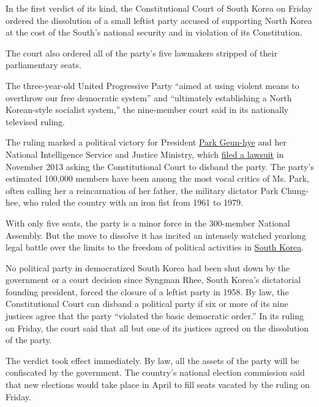 In the first verdict of its kind, the Constitutional Court of South
Korea on Friday ordered the dissolution of a small leftist party accused
of supporting North Korea at the cost of the South's national security
and in violation of its Constitution.

The court also ordered all of the party's five lawmakers stripped of
their parliamentary seats.

The three-year-old United Progressive Party ``aimed at using violent
means to overthrow our free democratic system'' and ``ultimately
establishing a North Korean-style socialist system,'' the nine-member
court said in its nationally televised ruling.

The ruling marked a political victory for President
\href{http://topics.nytimes3xbfgragh.onion/top/reference/timestopics/people/p/park_geunhye/index.html}{Park
Geun-hye} and her National Intelligence Service and Justice Ministry,
which
\href{http://www.nytimes3xbfgragh.onion/2013/11/06/world/asia/south-korean-government-seeks-ban-of-small-leftist-party.html}{filed
a lawsuit} in November 2013 asking the Constitutional Court to disband
the party. The party's estimated 100,000 members have been among the
most vocal critics of Ms. Park, often calling her a reincarnation of her
father, the military dictator Park Chung-hee, who ruled the country with
an iron fist from 1961 to 1979.

With only five seats, the party is a minor force in the 300-member
National Assembly. But the move to dissolve it has incited an intensely
watched yearlong legal battle over the limits to the freedom of
political activities in
\href{http://topics.nytimes3xbfgragh.onion/top/news/international/countriesandterritories/southkorea/index.html}{South
Korea}.

No political party in democratized South Korea had been shut down by the
government or a court decision since Syngman Rhee, South Korea's
dictatorial founding president, forced the closure of a leftist party in
1958. By law, the Constitutional Court can disband a political party if
six or more of its nine justices agree that the party ``violated the
basic democratic order.'' In its ruling on Friday, the court said that
all but one of its justices agreed on the dissolution of the party.

The verdict took effect immediately. By law, all the assets of the party
will be confiscated by the government. The country's national election
commission said that new elections would take place in April to fill
seats vacated by the ruling on Friday.

